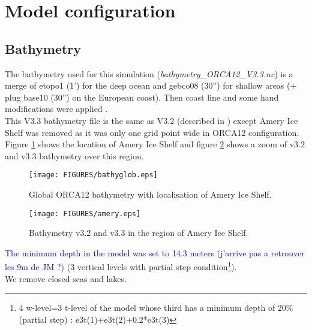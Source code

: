 \section{Model configuration}

\subsection{Bathymetry}

The bathymetry used for this simulation (\textit{bathymetry\_ORCA12\_V3.3.nc}) is a merge of etopo1 (1') 
for the deep ocean and gebco08 (30'') for shallow areas (+ plug base10 (30'') on the European coast). 
Then coast line and some hand modifications were applied \cite{bathy_v3.2_orca12}. \\

This V3.3 bathymetry file is the same as V3.2 (described in \cite{bathy_v3.2_orca12}) except Amery Ice Shelf was removed as it was only one grid point wide in ORCA12 configuration. 
Figure \ref{bathyglob} shows the location of Amery Ice Shelf and figure \ref{amery} shows a zoom of v3.2 and v3.3 bathymetry over this region.

\begin{figure}[H]
\begin{center}
\texttt{[image: FIGURES/bathyglob.eps]}
\caption{Global ORCA12 bathymetry with localisation of Amery Ice Shelf.}
\label{bathyglob}
\end{center}
\end{figure}

\begin{figure}[H]
\begin{center}
\texttt{[image: FIGURES/amery.eps]}
\caption{Bathymetry v3.2 and v3.3 in the region of Amery Ice Shelf.}
\label{amery}
\end{center}
\end{figure}

\textcolor{blue}{The minimum depth in the model was set to 14.3 meters (j'arrive pas a retrouver les 9m de JM ?)} (3 vertical levels with partial step condition\footnote{4 w-level=3 t-level of 
the model whose third has a minimum depth of 20\% (partial step) : e3t(1)+e3t(2)+0.2*e3t(3)}). \\

We remove closed seas and lakes.

